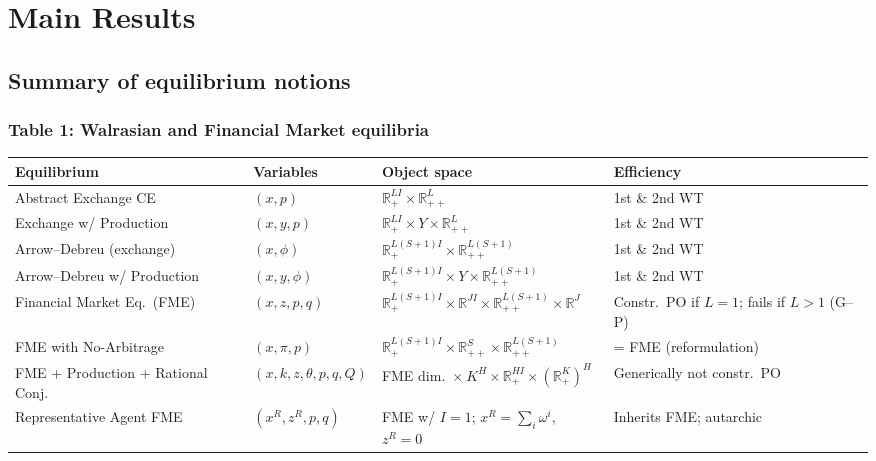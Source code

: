 \chapter{Main Results}


\section{Summary of equilibrium notions}

\subsection*{Table 1: Walrasian and Financial Market equilibria}

\renewcommand{\arraystretch}{1.3}
\setlength{\tabcolsep}{5pt}
\small
\noindent\begin{tabularx}{\textwidth}{|>{\raggedright\arraybackslash}p{3cm}|>{\raggedright\arraybackslash}p{2.8cm}|>{\raggedright\arraybackslash}X|>{\raggedright\arraybackslash}p{3.4cm}|}
\hline
\textbf{Equilibrium} & \textbf{Variables} & \textbf{Object space} & \textbf{Efficiency} \\
\hline
Abstract Exchange CE & $(x, p)$ & $\mathbb{R}_+^{LI} \times \mathbb{R}_{++}^L$ & 1st \& 2nd WT \\
\hline
Exchange w/ Production & $(x, y, p)$ & $\mathbb{R}_+^{LI} \times Y \times \mathbb{R}_{++}^L$ & 1st \& 2nd WT \\
\hline
Arrow--Debreu (exchange) & $(x, \phi)$ & $\mathbb{R}_+^{L(S+1)I} \times \mathbb{R}_{++}^{L(S+1)}$ & 1st \& 2nd WT \\
\hline
Arrow--Debreu w/ Production & $(x, y, \phi)$ & $\mathbb{R}_+^{L(S+1)I} \times Y \times \mathbb{R}_{++}^{L(S+1)}$ & 1st \& 2nd WT \\
\hline
Financial Market Eq.\ (FME) & $(x, z, p, q)$ & $\mathbb{R}_+^{L(S+1)I} \times \mathbb{R}^{JI} \times \mathbb{R}_{++}^{L(S+1)} \times \mathbb{R}^J$ & Constr.\ PO if $L=1$; fails if $L>1$ (G--P) \\
\hline
FME with No-Arbitrage & $(x, \pi, p)$ & $\mathbb{R}_+^{L(S+1)I} \times \mathbb{R}_{++}^S \times \mathbb{R}_{++}^{L(S+1)}$ & = FME (reformulation) \\
\hline
FME + Production + Rational Conj. & $(x, k, z, \theta, p, q, Q)$ & FME dim.\ $\times\ K^H \times \mathbb{R}_+^{HI} \times (\mathbb{R}_+^K)^H$ & Generically not constr.\ PO \\
\hline
Representative Agent FME & $(x^R, z^R, p, q)$ & FME w/ $I=1$; $x^R = \sum_i \omega^i$, $z^R = 0$ & Inherits FME; autarchic \\
\hline
\end{tabularx}


